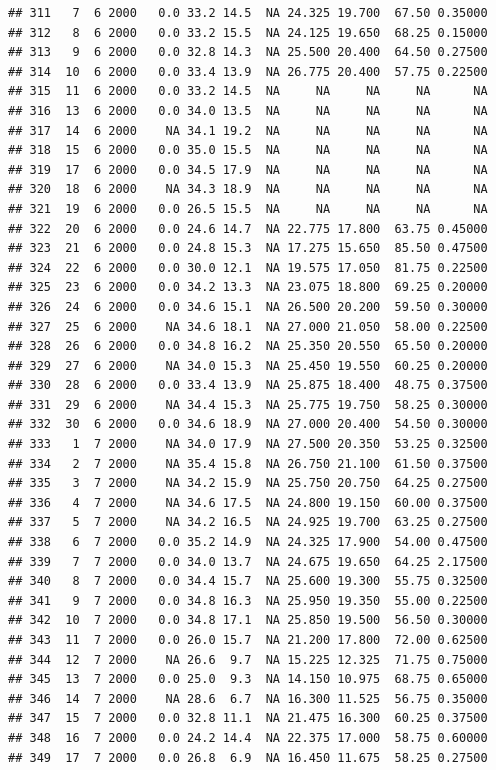 \documentclass[
]{book}
\begin{document}
\begin{verbatim}
## 311   7  6 2000   0.0 33.2 14.5  NA 24.325 19.700  67.50 0.35000
## 312   8  6 2000   0.0 33.2 15.5  NA 24.125 19.650  68.25 0.15000
## 313   9  6 2000   0.0 32.8 14.3  NA 25.500 20.400  64.50 0.27500
## 314  10  6 2000   0.0 33.4 13.9  NA 26.775 20.400  57.75 0.22500
## 315  11  6 2000   0.0 33.2 14.5  NA     NA     NA     NA      NA
## 316  13  6 2000   0.0 34.0 13.5  NA     NA     NA     NA      NA
## 317  14  6 2000    NA 34.1 19.2  NA     NA     NA     NA      NA
## 318  15  6 2000   0.0 35.0 15.5  NA     NA     NA     NA      NA
## 319  17  6 2000   0.0 34.5 17.9  NA     NA     NA     NA      NA
## 320  18  6 2000    NA 34.3 18.9  NA     NA     NA     NA      NA
## 321  19  6 2000   0.0 26.5 15.5  NA     NA     NA     NA      NA
## 322  20  6 2000   0.0 24.6 14.7  NA 22.775 17.800  63.75 0.45000
## 323  21  6 2000   0.0 24.8 15.3  NA 17.275 15.650  85.50 0.47500
## 324  22  6 2000   0.0 30.0 12.1  NA 19.575 17.050  81.75 0.22500
## 325  23  6 2000   0.0 34.2 13.3  NA 23.075 18.800  69.25 0.20000
## 326  24  6 2000   0.0 34.6 15.1  NA 26.500 20.200  59.50 0.30000
## 327  25  6 2000    NA 34.6 18.1  NA 27.000 21.050  58.00 0.22500
## 328  26  6 2000   0.0 34.8 16.2  NA 25.350 20.550  65.50 0.20000
## 329  27  6 2000    NA 34.0 15.3  NA 25.450 19.550  60.25 0.20000
## 330  28  6 2000   0.0 33.4 13.9  NA 25.875 18.400  48.75 0.37500
## 331  29  6 2000    NA 34.4 15.3  NA 25.775 19.750  58.25 0.30000
## 332  30  6 2000   0.0 34.6 18.9  NA 27.000 20.400  54.50 0.30000
## 333   1  7 2000    NA 34.0 17.9  NA 27.500 20.350  53.25 0.32500
## 334   2  7 2000    NA 35.4 15.8  NA 26.750 21.100  61.50 0.37500
## 335   3  7 2000    NA 34.2 15.9  NA 25.750 20.750  64.25 0.27500
## 336   4  7 2000    NA 34.6 17.5  NA 24.800 19.150  60.00 0.37500
## 337   5  7 2000    NA 34.2 16.5  NA 24.925 19.700  63.25 0.27500
## 338   6  7 2000   0.0 35.2 14.9  NA 24.325 17.900  54.00 0.47500
## 339   7  7 2000   0.0 34.0 13.7  NA 24.675 19.650  64.25 2.17500
## 340   8  7 2000   0.0 34.4 15.7  NA 25.600 19.300  55.75 0.32500
## 341   9  7 2000   0.0 34.8 16.3  NA 25.950 19.350  55.00 0.22500
## 342  10  7 2000   0.0 34.8 17.1  NA 25.850 19.500  56.50 0.30000
## 343  11  7 2000   0.0 26.0 15.7  NA 21.200 17.800  72.00 0.62500
## 344  12  7 2000    NA 26.6  9.7  NA 15.225 12.325  71.75 0.75000
## 345  13  7 2000   0.0 25.0  9.3  NA 14.150 10.975  68.75 0.65000
## 346  14  7 2000    NA 28.6  6.7  NA 16.300 11.525  56.75 0.35000
## 347  15  7 2000   0.0 32.8 11.1  NA 21.475 16.300  60.25 0.37500
## 348  16  7 2000   0.0 24.2 14.4  NA 22.375 17.000  58.75 0.60000
## 349  17  7 2000   0.0 26.8  6.9  NA 16.450 11.675  58.25 0.27500

\end{verbatim}
\end{document}
